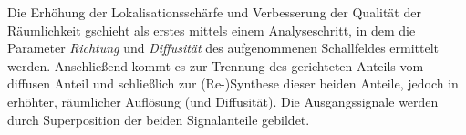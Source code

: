 Die Erhöhung der Lokalisationsschärfe und Verbesserung der Qualität der Räumlichkeit gschieht als erstes mittels einem Analyseschritt, in dem die Parameter \textit{Richtung} und \textit{Diffusität} des aufgenommenen Schallfeldes ermittelt werden. Anschließend kommt es zur Trennung des gerichteten Anteils vom diffusen Anteil und schließlich zur (Re-)Synthese dieser beiden Anteile, jedoch in erhöhter, räumlicher Auflösung (und Diffusität). Die Ausgangssignale werden durch Superposition der beiden Signalanteile gebildet.